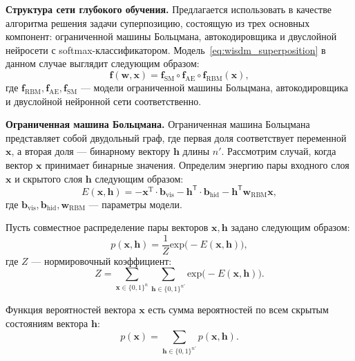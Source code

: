 \textbf{Структура сети глубокого обучения. }
Предлагается использовать в качестве алгоритма решения задачи суперпозицию, состоящую из трех основных компонент:
ограниченной машины Больцмана, автокодировщика и двуслойной нейросети с softmax-классификатором.
Модель~\eqref{eq:wisdm_superposition} в данном случае выглядит следующим образом:
\[
    \mathbf{f}(\mathbf{w}, \mathbf{x}) = \mathbf{f}_\text{SM} \circ \mathbf{f}_\text{AE} \circ  \mathbf{f}_\text{RBM}(\mathbf{x}),
\]
где $\mathbf{f}_\text{RBM}, \mathbf{f}_\text{AE}, \mathbf{f}_\text{SM}$ --- модели ограниченной машины Больцмана, автокодировщика и двуслойной нейронной сети соответственно.

\textbf{Ограниченная машина Больцмана.}
Ограниченная машина Больцмана представляет собой двудольный граф, где первая доля соответствует переменной $\mathbf{x}$, а вторая доля --- бинарному вектору $\mathbf{h}$ длины $n'$.
Рассмотрим случай, когда вектор $\mathbf{x}$ принимает бинарные значения. Определим энергию пары входного слоя $\mathbf{x}$ и скрытого слоя $\mathbf{h}$ следующим образом:
\[
 E(\mathbf{x},\mathbf{h}) = -\mathbf{x}^\text{T} \cdot \mathbf{b}_\text{vis} -\mathbf{h}^\mathsf{T} \cdot \mathbf{b}_\text{hid} - \mathbf{h}^\mathsf{T}\mathbf{w}_\text{RBM}\mathbf{x},
\]
где $\mathbf{b}_\text{vis}, \mathbf{b}_\text{hid}, \mathbf{w}_\text{RBM}$ --- параметры модели.

Пусть совместное распределение пары векторов $\mathbf{x}, \mathbf{h}$ задано следующим образом:
\[
	p(\mathbf{x}, \mathbf{h}) = \frac{1}{Z} \text{exp}\bigl(-E(\mathbf{x},\mathbf{h})\bigr),
\]
где $Z$ --- нормировочный коэффициент:
\[
 Z = \sum_{\mathbf{x} \in \{0,1\}^n} \sum_{\mathbf{h}\in \{0,1\}^{n'}} \text{exp}\bigl(-E(\mathbf{x},\mathbf{h})\bigr).
\]


Функция вероятностей вектора $\mathbf{x}$ есть сумма вероятностей по всем скрытым состояниям вектора $\mathbf{h}$:
\[
	p(\mathbf{x}) = \sum_{\mathbf{h}\in \{0,1\}^{n'}} p(\mathbf{x}, \mathbf{h}).
\]

